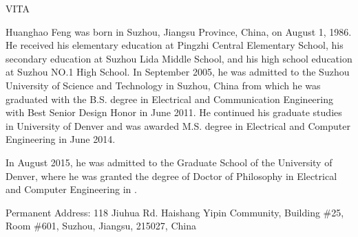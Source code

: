 \newpage
\thispagestyle{empty}
\vspace*{0.2in}
\begin{center}
VITA
\end{center}

\vspace*{0.2in} Huanghao Feng was born in Suzhou, Jiangsu
Province, China, on August 1, 1986. He received his elementary
education at Pingzhi Central Elementary School, his secondary
education at Suzhou Lida Middle School, and his high school
education at  Suzhou NO.1 High School. In September 2005, he was
admitted to the Suzhou University of Science and Technology in 
Suzhou, China from which he was graduated with the B.S. degree in 
Electrical and Communication Engineering with Best Senior Design Honor
in June 2011. He continued his graduate studies in University of Denver
and was awarded M.S. degree in Electrical and Computer Engineering 
in June 2014.

\vspace*{0.2in} In August 2015, he was admitted to the Graduate
School of the University of Denver, where he was granted the degree
of Doctor of Philosophy in Electrical and Computer Engineering in
\mydate.

\vspace*{0.5in} \noindent Permanent Address: 118 Jiuhua Rd. 
Haishang Yipin Community, Building \#25, Room \#601, Suzhou, 
Jiangsu, 215027, China
